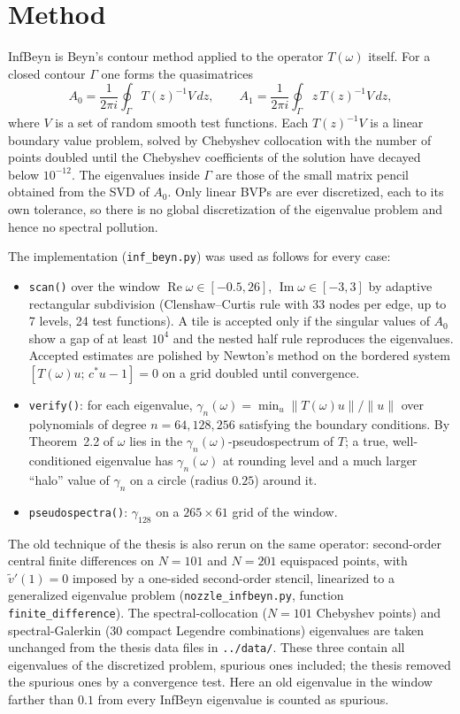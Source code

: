 \documentclass[11pt]{article}
\newcommand{\Real}{\operatorname{Re}}
\newcommand{\Imag}{\operatorname{Im}}
\newcommand{\infbeyn}{InfBeyn}
\begin{document}
\section{Method}

\infbeyn{} \cite{colbrook2023} is Beyn's contour method applied to the operator $T(\omega)$ itself. For a closed
contour $\Gamma$ one forms the quasimatrices
\begin{equation}
  A_0 = \frac1{2\pi i}\oint_\Gamma T(z)^{-1}V\,dz,\qquad
  A_1 = \frac1{2\pi i}\oint_\Gamma z\,T(z)^{-1}V\,dz,
\end{equation}
where $V$ is a set of random smooth test functions. Each $T(z)^{-1}V$ is a linear boundary value problem,
solved by Chebyshev collocation with the number of points doubled until the Chebyshev coefficients of the
solution have decayed below $10^{-12}$. The eigenvalues inside $\Gamma$ are those of the small matrix pencil
obtained from the SVD of $A_0$. Only linear BVPs are ever discretized, each to its own tolerance, so there is
no global discretization of the eigenvalue problem and hence no spectral pollution.

The implementation (\texttt{inf\_beyn.py}) was used as follows for every case:
\begin{itemize}
  \item \texttt{scan()} over the window $\Real\omega\in[-0.5,26]$, $\Imag\omega\in[-3,3]$ by adaptive
  rectangular subdivision (Clenshaw--Curtis rule with 33 nodes per edge, up to 7 levels, 24 test functions).
  A tile is accepted only if the singular values of $A_0$ show a gap of at least $10^4$ and the nested
  half rule reproduces the eigenvalues. Accepted estimates are polished by Newton's method on the bordered
  system $[T(\omega)u;\,c^*u-1]=0$ on a grid doubled until convergence.
  \item \texttt{verify()}: for each eigenvalue, $\gamma_n(\omega)=\min_u\|T(\omega)u\|/\|u\|$ over
  polynomials of degree $n=64,128,256$ satisfying the boundary conditions. By Theorem~2.2 of
  \cite{colbrook2023} $\omega$ lies in the $\gamma_n(\omega)$-pseudospectrum of $T$; a true, well-conditioned
  eigenvalue has $\gamma_n(\omega)$ at rounding level and a much larger ``halo'' value of $\gamma_n$ on a
  circle (radius $0.25$) around it.
  \item \texttt{pseudospectra()}: $\gamma_{128}$ on a $265\times61$ grid of the window.
\end{itemize}
The old technique of the thesis is also rerun on the same operator: second-order central finite differences
on $N=101$ and $N=201$ equispaced points, with $\tilde v'(1)=0$ imposed by a one-sided second-order stencil,
linearized to a generalized eigenvalue problem (\texttt{nozzle\_infbeyn.py}, function
\texttt{finite\_difference}). The spectral-collocation ($N=101$ Chebyshev points) and spectral-Galerkin
(30 compact Legendre combinations) eigenvalues are taken unchanged from the thesis data files in
\texttt{../data/}. These three contain all eigenvalues of the discretized problem, spurious ones included;
the thesis removed the spurious ones by a convergence test. Here an old eigenvalue in the window farther than
$0.1$ from every \infbeyn{} eigenvalue is counted as spurious.
\end{document}
